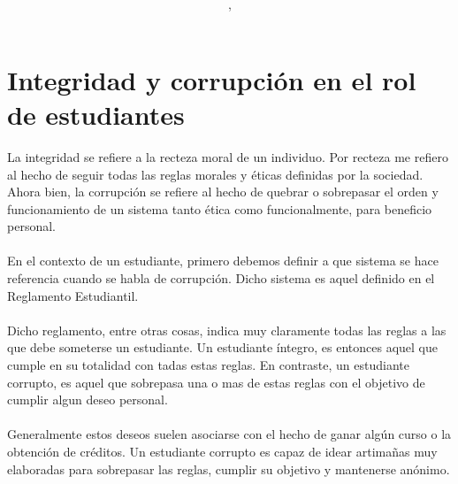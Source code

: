 \documentclass{article}
\author{\nombre , \carnet}
\title{\textbf{\Huge\titulo}}
\begin{document}
\maketitle
\section {Integridad y corrupción en el rol de estudiantes}
La integridad se refiere a la recteza moral de un 
individuo. Por recteza me refiero al hecho de seguir todas las 
reglas morales y éticas definidas por la sociedad.
Ahora bien, la corrupción se refiere al hecho de quebrar o sobrepasar
el orden y funcionamiento de un sistema tanto 
ética como funcionalmente, para beneficio personal. \\\\

En el contexto de un estudiante, primero debemos definir  a
que sistema se hace referencia cuando se habla de corrupción. 
Dicho sistema es aquel definido en el Reglamento Estudiantil. \\\\

Dicho reglamento, entre otras cosas,  indica muy claramente todas las 
reglas a las que debe someterse un estudiante. Un estudiante íntegro, 
es entonces aquel que cumple en su totalidad con tadas estas reglas.
En contraste, un estudiante corrupto, es aquel que sobrepasa 
una o mas de estas reglas con el objetivo de cumplir algun deseo 
personal. \\\\

Generalmente estos deseos suelen asociarse con el hecho de
ganar algún curso o la obtención de créditos. Un estudiante corrupto
es capaz de idear artimañas muy elaboradas para sobrepasar las 
reglas, cumplir su objetivo y mantenerse anónimo. \\\\
\end{document}
